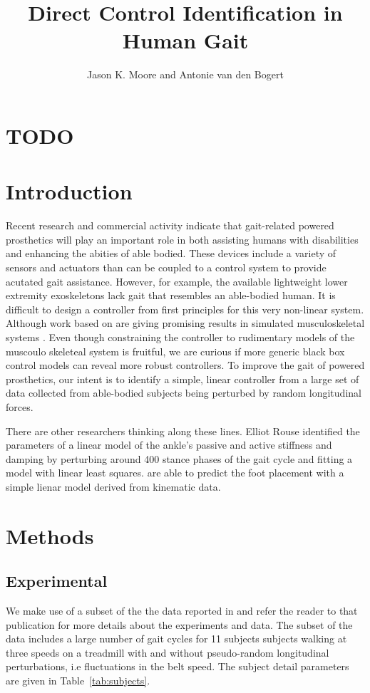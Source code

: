 \documentclass{article}
\author{Jason K. Moore and Antonie van den Bogert}
\title{Direct Control Identification in Human Gait}
\date{}
\begin{document}
\section*{TODO}

\listoftodos

\section*{Introduction}
%
Recent research and commercial activity indicate that gait-related powered
prosthetics will play an important role in both assisting humans with
disabilities and enhancing the abities of able bodied. These devices include a
variety of sensors and actuators than can be coupled to a control system to
provide acutated gait assistance. However, for example, the available
lightweight lower extremity exoskeletons lack gait that resembles an
able-bodied human. It is difficult to design a controller from first principles
for this very non-linear system. Although work based on \cite{Geyer2010} are
giving promising results in simulated musculoskeletal systems \cite{Wang2010,
Geitenbeek2014}. Even though constraining the controller to rudimentary models
of the muscoulo skeleteal system is fruitful, we are curious if more generic
black box control models can reveal more robust controllers. To improve the
gait of powered prosthetics, our intent is to identify a simple, linear
controller from a large set of data collected from able-bodied subjects being
perturbed by random longitudinal forces.

There are other researchers thinking along these lines. Elliot Rouse identified
the parameters of a linear model of the ankle's passive and active stiffness
and damping by perturbing around 400 stance phases of the gait cycle and
fitting a model with linear least squares. \cite{Wang2013} are able to predict
the foot placement with a simple lienar model derived from kinematic data.
%
\section*{Methods}
%
\subsection{Experimental}
%
We make use of a subset of the the data reported in \cite{Moore2015} and refer
the reader to that publication for more details about the experiments and data.
The subset of the data includes a large number of gait cycles for 11 subjects
subjects walking at three speeds on a treadmill with and without pseudo-random
longitudinal perturbations, i.e fluctuations in the belt speed. The subject
detail parameters are given in Table~\ref{tab:subjects}.
%
\begin{table}
  \cprotect\caption{Information about the 11 study participants. The final
    three columns provide the trial numbers associated with each nominal
    treadmill speed. The measured mass is computed from the mean total vertical
    ground reaction force just after the calibration pose event. Generated by
    \verb|src/subject_table.py|.}
  \centering
  
  \label{tab:subjects}
\end{table}
\end{document}
